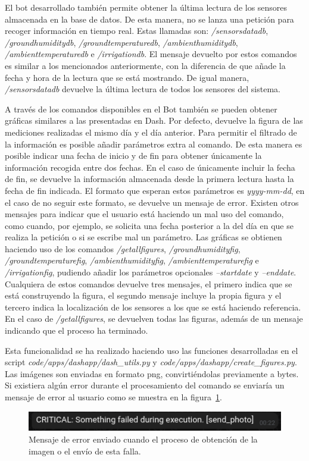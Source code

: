 \documentclass[a4paper, 12pt, oneside]{book}
\begin{document}
El bot desarrollado también permite obtener la última lectura de los sensores almacenada en la base de datos. De esta manera, no se lanza una petición para recoger información en tiempo real. Estas llamadas son: \textit{/sensorsdatadb}, \textit{/groundhumiditydb}, \textit{/groundtemperaturedb}, \textit{/ambienthumiditydb}, \textit{/ambienttemperaturedb} e \textit{/irrigationdb}. El mensaje devuelto por estos comandos es similar a los mencionados anteriormente, con la diferencia de que añade la fecha y hora de la lectura que se está mostrando. De igual manera, \textit{/sensorsdatadb} devuelve la última lectura de todos los sensores del sistema.

A través de los comandos disponibles en el Bot también se pueden obtener gráficas similares a las presentadas en Dash. Por defecto, devuelve la figura de las mediciones realizadas el mismo día y el día anterior. Para permitir el filtrado de la información es posible añadir parámetros extra al comando. De esta manera es posible indicar una fecha de inicio y de fin para obtener únicamente la información recogida entre dos fechas. En el caso de únicamente incluir la fecha de fin, se devuelve la información almacenada desde la primera lectura hasta la fecha de fin indicada. El formato que esperan estos parámetros es \textit{yyyy-mm-dd}, en el caso de no seguir este formato, se devuelve un mensaje de error.
Existen otros mensajes para indicar que el usuario está haciendo un mal uso del comando, como cuando, por ejemplo, se solicita una fecha posterior a la del día en que se realiza la petición o si se escribe mal un parámetro.
Las gráficas se obtienen haciendo uso de los comandos \textit{/getallfigures}, \textit{/groundhumidityfig}, \textit{/groundtemperaturefig}, \textit{/ambienthumidityfig}, \textit{/ambienttemperaturefig} e \textit{/irrigationfig}, pudiendo añadir los parámetros opcionales \textit{--startdate} y \textit{--enddate}. Cualquiera de estos comandos devuelve tres mensajes, el primero indica que se está construyendo la figura, el segundo mensaje incluye la propia figura y el tercero indica la localización de los sensores a los que se está haciendo referencia. En el caso de \textit{/getallfigures}, se devuelven todas las figuras, además de un mensaje indicando que el proceso ha terminado.

Esta funcionalidad se ha realizado haciendo uso las funciones desarrolladas en el script \textit{code/apps/dashapp/dash\_utils.py} y \textit{code/apps/dashapp/create\_figures.py}. Las imágenes son enviadas en formato png, convirtiéndolas previamente a bytes. Si existiera algún error durante el procesamiento del comando se enviaría un mensaje de error al usuario como se muestra en la figura~\ref{figura:error send photo}.
\begin{figure}[H]
	\centering
    \includegraphics[width=12cm, keepaspectratio]{img/error_send_photo}
    \caption{Mensaje de error enviado cuando el proceso de obtención de la imagen o el envío de esta falla.}
    \label{figura:error send photo}
\end{figure}
\end{document}
